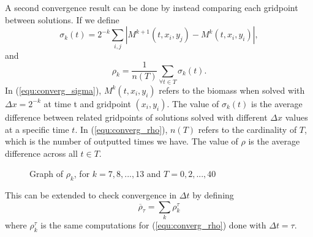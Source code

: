 A second convergence result can be done by instead comparing each gridpoint between solutions. If we define 
\begin{equation} \label{equ:converg_sigma}
    \sigma_k(t) = 2^{-k} \sum_{i,j} |M^{k+1}(t, x_i, y_j) - M^k(t, x_i, y_i)|,
\end{equation}
and 
\begin{equation} \label{equ:converg_rho}
    \rho_k = \frac{1}{n(T)} \sum_{\forall t \in T} \sigma_k(t).
\end{equation}
In (\ref{equ:converg_sigma}), $M^{k}(t,x_i,y_i)$ refers to the biomass when solved with $\Delta x = 2^{-k}$ at time t and gridpoint $(x_i, y_i)$. The value of $\sigma_k(t)$ is the average difference between related gridpoints of solutions solved with different $\Delta x$ values at a specific time $t$. In (\ref{equ:converg_rho}), $n(T)$ refers to the cardinality of $T$, which is the number of outputted times we have. The value of $\rho$ is the average difference across all $t \in T$. 

\begin{figure}[!htb]
    \begin{center}
        \caption{Graph of $\rho_k$, for $k = 7,8,...,13$ and $T = 0,2,...,40$}
        \label{fig:converg_rho}
    \end{center}
\end{figure}

This can be extended to check convergence in $\Delta t$ by defining
\begin{equation} \label{equ:converg_rhoBar}
    \overline{\rho}_{\tau} = \sum_k \rho^{\tau}_k
\end{equation}
where $\rho^{\tau}_k$ is the same computations for (\ref{equ:converg_rho}) done with $\Delta t = \tau$.







